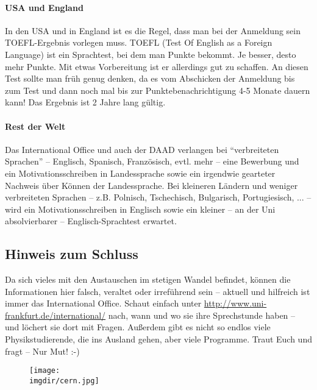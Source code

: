 \paragraph{USA und England}
In den USA und in England ist es die Regel, dass man bei der Anmeldung sein TOEFL-Ergebnis vorlegen muss. TOEFL (Test Of English as a Foreign Language) ist ein Sprachtest, bei dem man Punkte bekommt. Je besser, desto mehr Punkte. Mit etwas Vorbereitung ist er allerdings gut zu schaffen. An diesen Test sollte man früh genug denken, da es vom Abschicken der Anmeldung bis zum Test und dann noch mal bis zur Punktebenachrichtigung 4-5 Monate dauern kann! Das Ergebnis ist 2 Jahre lang gültig.

\paragraph{Rest der Welt}
Das International Office und auch der DAAD verlangen bei \enquote{verbreiteten Sprachen} -- Englisch, Spanisch, Französisch, evtl. mehr -- eine Bewerbung und ein Motivationsschreiben in Landessprache sowie ein irgendwie gearteter Nachweis über Können der Landessprache. Bei kleineren Ländern und weniger verbreiteten Sprachen -- z.B. Polnisch, Tschechisch, Bulgarisch, Portugiesisch, ... -- wird ein Motivationsschreiben in Englisch sowie ein kleiner -- an der Uni absolvierbarer -- Englisch-Sprachtest erwartet.

\subsection{Hinweis zum Schluss}
Da sich vieles mit den Austauschen im stetigen Wandel befindet, können die Informationen hier falsch, veraltet oder irreführend sein -- aktuell und hilfreich ist immer das International Office. Schaut einfach unter \url{http://www.uni-frankfurt.de/international/} nach, wann und wo sie ihre Sprechstunde haben -- und löchert sie dort mit Fragen. Außerdem gibt es nicht so endlos viele Physikstudierende, die ins Ausland gehen, aber viele Programme. Traut Euch und fragt -- Nur Mut! :-)
\newpage
\begin{figure}[!b]
	\centering
	\texttt{[image: \\imgdir/cern.jpg]}
\end{figure}